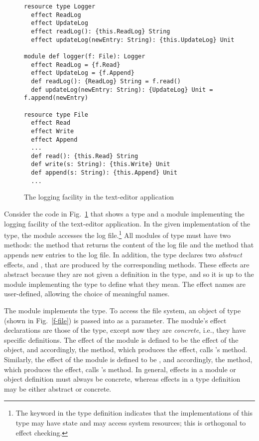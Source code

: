 \begin{figure}
\label{fig-logging}
\begin{lstlisting}
resource type Logger
  effect ReadLog
  effect UpdateLog
  effect readLog(): {this.ReadLog} String
  effect updateLog(newEntry: String): {this.UpdateLog} Unit

module def logger(f: File): Logger
  effect ReadLog = {f.Read}
  effect UpdateLog = {f.Append}
  def readLog(): {ReadLog} String = f.read()
  def updateLog(newEntry: String): {UpdateLog} Unit = f.append(newEntry)
  
resource type File
  effect Read
  effect Write
  effect Append
  ...
  def read(): {this.Read} String
  def write(s: String): {this.Write} Unit
  def append(s: String): {this.Append} Unit
  ...
\end{lstlisting}

\caption{The logging facility in the text-editor application}
\end{figure}

Consider the code in Fig.~\ref{fig-logging} that shows a type and a module implementing the logging facility of the text-editor application.  In the given implementation of the  type, the  module accesses the log file.\footnote{The keyword  in the type definition indicates that the implementations of this type may have state and may access system resources; this is orthogonal to effect checking.} All modules of type  must have two methods: the  method that returns the content of the log file and the  method that appends new entries to the log file. In addition, the  type declares two \textit{abstract} effects,  and , that are produced by the corresponding methods. These effects are abstract because they are not given a definition in the  type, and so it is up to the module implementing the  type to define what they mean. The effect names are user-defined, allowing the choice of meaningful names. 

The  module implements the  type. To access the file system, an object of type  (shown in Fig.~\ref{f-file}) is passed into  as a parameter. The  module's effect declarations are those of the  type, except now they are \textit{concrete}, i.e., they have specific definitions. The  effect of the  module is defined to be the  effect of the  object, and accordingly, the  method, which produces the  effect, calls 's  method. Similarly, the  effect of the  module is defined to be , and accordingly, the  method, which produces the  effect, calls 's  method. In general, effects in a module or object definition must always be concrete, whereas effects in a type definition may be either abstract or concrete.


